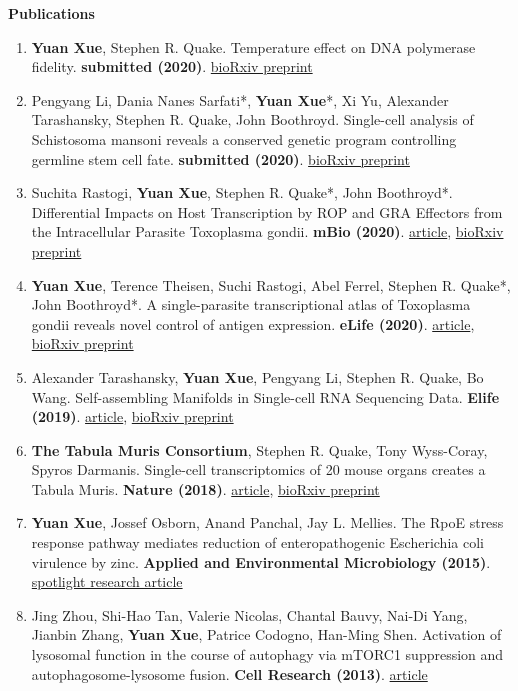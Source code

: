 \documentclass[letterpaper,12pt]{article}[leftmargin=*]
\renewcommand{\section}[2]{\vspace{5pt}
  \colorbox{secondary}{\color{white}\raggedbottom\normalsize\textbf{{#1}{\hspace{7pt}#2}}}
}
\begin{document}
\section{\faBook}{Publications}

\begin{enumerate}
    \item \textbf{Yuan Xue}, Stephen R. Quake. Temperature effect on DNA polymerase fidelity. \textbf{submitted (2020)}. \href{https://www.biorxiv.org/content/10.1101/2020.08.04.236919v1}{bioRxiv preprint}
    \item Pengyang Li, Dania Nanes Sarfati*, \textbf{Yuan Xue}*, Xi Yu, Alexander Tarashansky, Stephen R. Quake, John Boothroyd. Single-cell analysis of Schistosoma mansoni reveals a conserved genetic program controlling germline stem cell fate. \textbf{submitted (2020)}. \href{https://www.biorxiv.org/content/10.1101/2020.07.06.190033v1}{bioRxiv preprint}
    \item Suchita Rastogi, \textbf{Yuan Xue}, Stephen R. Quake*, John Boothroyd*. Differential Impacts on Host Transcription by ROP and GRA Effectors from the Intracellular Parasite Toxoplasma gondii. \textbf{mBio (2020)}. \href{https://mbio.asm.org/content/11/3/e00182-20}{article}, \href{https://www.biorxiv.org/content/10.1101/2020.02.04.934570v2.abstract}{bioRxiv preprint}
    \item \textbf{Yuan Xue}, Terence Theisen, Suchi Rastogi, Abel Ferrel, Stephen R. Quake*, John Boothroyd*. A single-parasite transcriptional atlas of Toxoplasma gondii reveals novel control of antigen expression. \textbf{eLife (2020)}. \href{https://elifesciences.org/articles/54129}{article}, \href{https://www.biorxiv.org/content/10.1101/656165v2}{bioRxiv preprint}
    \item Alexander Tarashansky, \textbf{Yuan Xue}, Pengyang Li, Stephen R. Quake, Bo Wang. Self-assembling Manifolds in Single-cell RNA Sequencing Data. \textbf{Elife (2019)}. \href{https://elifesciences.org/articles/48994}{article}, \href{https://www.biorxiv.org/content/10.1101/364166v2}{bioRxiv preprint}
    \item \textbf{The Tabula Muris Consortium}, Stephen R. Quake, Tony Wyss-Coray, Spyros Darmanis. Single-cell transcriptomics of 20 mouse organs creates a Tabula Muris. \textbf{Nature (2018)}. \href{https://www.nature.com/articles/s41586-018-0590-4}{article}, \href{https://www.biorxiv.org/content/10.1101/237446v2}{bioRxiv preprint}
    \item \textbf{Yuan Xue}, Jossef Osborn, Anand Panchal, Jay L. Mellies. The RpoE stress response pathway mediates reduction of enteropathogenic Escherichia coli virulence by zinc. \textbf{Applied and Environmental Microbiology (2015)}. \href{https://aem.asm.org/content/81/11/3766.short}{spotlight research article}
    \item  Jing Zhou, Shi-Hao Tan, Valerie Nicolas, Chantal Bauvy, Nai-Di Yang, Jianbin Zhang, \textbf{Yuan Xue}, Patrice Codogno, Han-Ming Shen. Activation of lysosomal function in the course of autophagy via mTORC1 suppression and autophagosome-lysosome fusion. \textbf{Cell Research (2013)}. \href{https://www.ncbi.nlm.nih.gov/pmc/articles/PMC3616426/}{article}


\end{enumerate}
\end{document}
